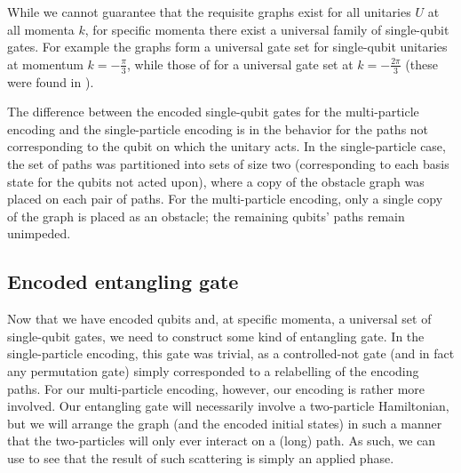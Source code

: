 \documentclass[../thesis-main/thesis-main]{subfiles}
\begin{document}
While we cannot guarantee that the requisite graphs exist for all unitaries $U$ at all momenta $k$, for specific momenta there exist a universal family of single-qubit gates.  For example the graphs  form a universal gate set for single-qubit unitaries at momentum $k = -\frac{\pi}{3}$, while those of  for a universal gate set at $k = -\frac{2\pi}{3}$ (these were found in \cite{BUF11}).


The difference between the encoded single-qubit gates for the multi-particle encoding and the single-particle encoding is in the behavior for the paths not corresponding to the qubit on which the unitary acts.  In the single-particle case, the set of paths was partitioned into sets of size two (corresponding to each basis state for the qubits not acted upon), where a copy of the obstacle graph was placed on each pair of paths. For the multi-particle encoding, only a single copy of the graph is placed as an obstacle; the remaining qubits' paths remain unimpeded.  



\subsection{Encoded entangling gate}

Now that we have encoded qubits and, at specific momenta, a universal set of single-qubit gates, we need to construct some kind of entangling gate.  In the single-particle encoding, this gate was trivial, as a controlled-not gate (and in fact any permutation gate) simply corresponded to a relabelling of the encoding paths.  For our multi-particle encoding, however, our encoding is rather more involved.  Our entangling gate will necessarily involve a two-particle Hamiltonian, but we will arrange the graph (and the encoded initial states) in such a manner that the two-particles will only ever interact on a (long) path.  As such, we can use  to see that the result of such scattering is simply an applied phase.  
\end{document}
